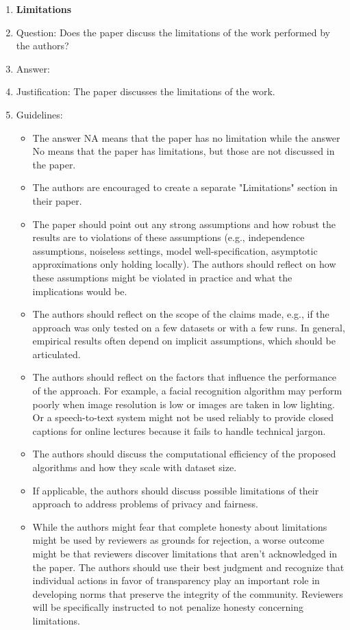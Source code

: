 \documentclass{article}
\numberwithin{equation}{section}
\theoremstyle{definition}
\begin{document}
\begin{enumerate}
\item {\bf Limitations}
    \item[] Question: Does the paper discuss the limitations of the work performed by the authors?
    \item[] Answer: \answerYes{} %
    \item[] Justification: The paper discusses the limitations of the work.
    \item[] Guidelines:
    \begin{itemize}
        \item The answer NA means that the paper has no limitation while the answer No means that the paper has limitations, but those are not discussed in the paper. 
        \item The authors are encouraged to create a separate "Limitations" section in their paper.
        \item The paper should point out any strong assumptions and how robust the results are to violations of these assumptions (e.g., independence assumptions, noiseless settings, model well-specification, asymptotic approximations only holding locally). The authors should reflect on how these assumptions might be violated in practice and what the implications would be.
        \item The authors should reflect on the scope of the claims made, e.g., if the approach was only tested on a few datasets or with a few runs. In general, empirical results often depend on implicit assumptions, which should be articulated.
        \item The authors should reflect on the factors that influence the performance of the approach. For example, a facial recognition algorithm may perform poorly when image resolution is low or images are taken in low lighting. Or a speech-to-text system might not be used reliably to provide closed captions for online lectures because it fails to handle technical jargon.
        \item The authors should discuss the computational efficiency of the proposed algorithms and how they scale with dataset size.
        \item If applicable, the authors should discuss possible limitations of their approach to address problems of privacy and fairness.
        \item While the authors might fear that complete honesty about limitations might be used by reviewers as grounds for rejection, a worse outcome might be that reviewers discover limitations that aren't acknowledged in the paper. The authors should use their best judgment and recognize that individual actions in favor of transparency play an important role in developing norms that preserve the integrity of the community. Reviewers will be specifically instructed to not penalize honesty concerning limitations.
    \end{itemize}


\end{enumerate}
\end{document}
